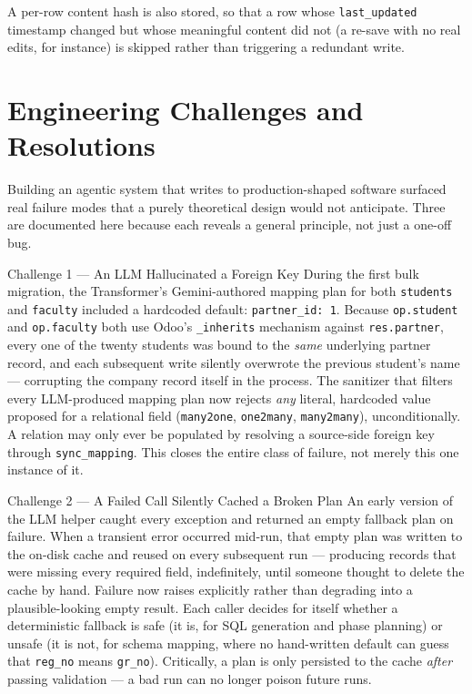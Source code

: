 \documentclass[11pt,a4paper]{article}
\begin{document}
A per-row content hash is also stored, so that a row whose \texttt{last\_updated} timestamp changed but whose meaningful content did not (a re-save with no real edits, for instance) is skipped rather than triggering a redundant write.

\newpage
\section{Engineering Challenges and Resolutions}

Building an agentic system that writes to production-shaped software surfaced real failure modes that a purely theoretical design would not anticipate. Three are documented here because each reveals a general principle, not just a one-off bug.

\begin{challengebox}{Challenge 1 --- An LLM Hallucinated a Foreign Key}
During the first bulk migration, the Transformer's Gemini-authored mapping plan for both \texttt{students} and \texttt{faculty} included a hardcoded default: \texttt{partner\_id: 1}. Because \texttt{op.student} and \texttt{op.faculty} both use Odoo's \texttt{\_inherits} mechanism against \texttt{res.partner}, every one of the twenty students was bound to the \emph{same} underlying partner record, and each subsequent write silently overwrote the previous student's name --- corrupting the company record itself in the process.
\tcblower
The sanitizer that filters every LLM-produced mapping plan now rejects \emph{any} literal, hardcoded value proposed for a relational field (\texttt{many2one}, \texttt{one2many}, \texttt{many2many}), unconditionally. A relation may only ever be populated by resolving a source-side foreign key through \texttt{sync\_mapping}. This closes the entire class of failure, not merely this one instance of it.
\end{challengebox}

\vspace{0.7em}
\begin{challengebox}{Challenge 2 --- A Failed Call Silently Cached a Broken Plan}
An early version of the LLM helper caught every exception and returned an empty fallback plan on failure. When a transient error occurred mid-run, that empty plan was written to the on-disk cache and reused on every subsequent run --- producing records that were missing every required field, indefinitely, until someone thought to delete the cache by hand.
\tcblower
Failure now raises explicitly rather than degrading into a plausible-looking empty result. Each caller decides for itself whether a deterministic fallback is safe (it is, for SQL generation and phase planning) or unsafe (it is not, for schema mapping, where no hand-written default can guess that \texttt{reg\_no} means \texttt{gr\_no}). Critically, a plan is only persisted to the cache \emph{after} passing validation --- a bad run can no longer poison future runs.
\end{challengebox}
\end{document}

